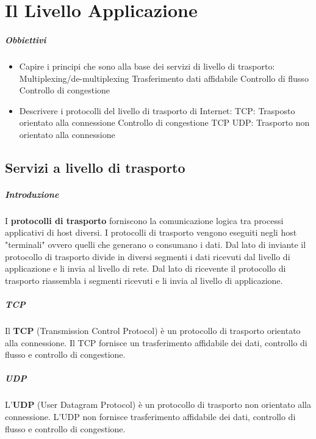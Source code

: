 \chapter{Il Livello Applicazione}
\thispagestyle{chapterInit}
\paragraph{Obbiettivi}
    \begin{itemize}
        \item Capire i principi che sono alla base dei servizi di livello di trasporto:
            \subitem Multiplexing/de-multiplexing
            \subitem Trasferimento dati affidabile
            \subitem Controllo di flusso
            \subitem Controllo di congestione
        \item Descrivere i protocolli del livello di trasporto di Internet:
            \subitem TCP: Trasposto orientato alla connessione
            \subitem Controllo di congestione TCP
            \subitem UDP: Trasporto non orientato alla connessione
    \end{itemize}
\section{Servizi a livello di trasporto}
    \paragraph{Introduzione} I \textbf{protocolli di trasporto} forniscono la comunicazione logica tra processi applicativi di host diversi. I protocolli di trasporto vengono eseguiti negli host "terminali" ovvero quelli che generano o consumano i dati. Dal lato di inviante il protocollo di trasporto divide in diversi segmenti i dati ricevuti dal livello di applicazione e li invia al livello di rete. Dal lato di ricevente il protocollo di trasporto riassembla i segmenti ricevuti e li invia al livello di applicazione.
    \paragraph{TCP} Il \textbf{TCP} (Transmission Control Protocol) è un protocollo di trasporto orientato alla connessione. Il TCP fornisce un trasferimento affidabile dei dati, controllo di flusso e controllo di congestione.
    \paragraph{UDP} L'\textbf{UDP} (User Datagram Protocol) è un protocollo di trasporto non orientato alla connessione. L'UDP non fornisce trasferimento affidabile dei dati, controllo di flusso e controllo di congestione.
